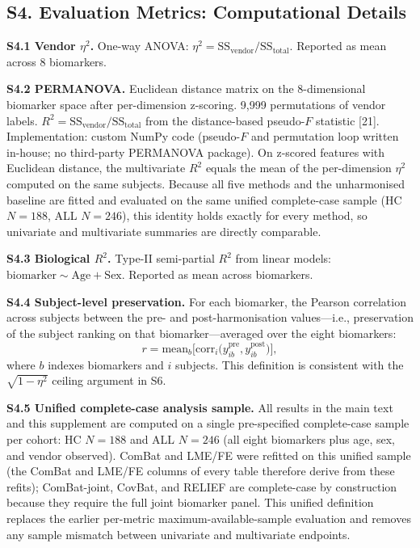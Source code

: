 \documentclass[12pt,a4paper]{article}
\begin{document}
\subsection*{S4. Evaluation Metrics: Computational Details}

\textbf{S4.1 Vendor $\eta^2$.} One-way ANOVA: $\eta^2 = \text{SS}_{\text{vendor}} / \text{SS}_{\text{total}}$. Reported as mean across 8 biomarkers.

\textbf{S4.2 PERMANOVA.} Euclidean distance matrix on the 8-dimensional biomarker space after per-dimension z-scoring. 9,999 permutations of vendor labels. $R^2 = \text{SS}_{\text{vendor}} / \text{SS}_{\text{total}}$ from the distance-based pseudo-$F$ statistic [21]. Implementation: custom NumPy code (pseudo-$F$ and permutation loop written in-house; no third-party PERMANOVA package). On z-scored features with Euclidean distance, the multivariate $R^2$ equals the mean of the per-dimension $\eta^2$ computed on the same subjects. Because all five methods and the unharmonised baseline are fitted and evaluated on the same unified complete-case sample (HC $N=188$, ALL $N=246$), this identity holds exactly for every method, so univariate and multivariate summaries are directly comparable.

\textbf{S4.3 Biological $R^2$.} Type-II semi-partial $R^2$ from linear models: $\text{biomarker} \sim \text{Age} + \text{Sex}$. Reported as mean across biomarkers.

\textbf{S4.4 Subject-level preservation.} For each biomarker, the Pearson correlation across subjects between the pre- and post-harmonisation values---i.e., preservation of the subject ranking on that biomarker---averaged over the eight biomarkers:
\[ r = \text{mean}_{b}\big[\text{corr}_{i}\big(y_{ib}^{\text{pre}}, y_{ib}^{\text{post}}\big)\big], \]
where $b$ indexes biomarkers and $i$ subjects. This definition is consistent with the $\sqrt{1-\eta^2}$ ceiling argument in S6.

\textbf{S4.5 Unified complete-case analysis sample.} All results in the main text and this supplement are computed on a single pre-specified complete-case sample per cohort: HC $N=188$ and ALL $N=246$ (all eight biomarkers plus age, sex, and vendor observed). ComBat and LME/FE were refitted on this unified sample (the ComBat and LME/FE columns of every table therefore derive from these refits); ComBat-joint, CovBat, and RELIEF are complete-case by construction because they require the full joint biomarker panel. This unified definition replaces the earlier per-metric maximum-available-sample evaluation and removes any sample mismatch between univariate and multivariate endpoints.
\end{document}
